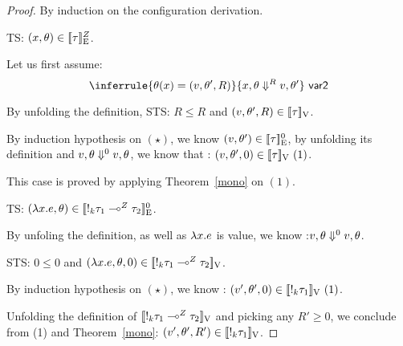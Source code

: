 \begin{proof}
  By induction on the configuration derivation.\\
   

  TS: $(x, \env) \in  \lre{}{\nnatA}{ \type}$.
  
  Let us first assume: \[   \inferrule{  \env(x)  =  (\valr, \env',  \adapt)  }{x,
      \env  \bigstep{\adapt} \valr, \env' }~\textsf{var2}  \]
  
  By unfolding the definition, STS: $R \leq R $  and $ (\valr, \env', R  ) \in \lrv{\type} $.

  By induction hypothesis on $(\star)$, we know $ (\valr, \env') \in \lre{}{0}{\type} $, by unfolding its definition and $ \valr, \env \bigstep{0} \valr, \env $,  we know that : $ (\valr, \env' ,0) \in \lrv{\type}~(1)$.

  This case is proved by applying Theorem~\ref{mono} on $(1)$.\\


   TS: $(\lambda x. \expr , \env) \in  \lre{}{0}{  \bang{\idx} \type_1\lto{\nnatA} \type_2 }$.
  
  By unfoling the definition, as well as $\lambda x. \expr$ is value, we know :$ \valr, \env \bigstep{0} \valr, \env$.
  
  STS: $0 \leq 0 $  and $ (\lambda x.\expr, \env, 0  ) \in \lrv{ \bang{\idx} \type_1\lto{\nnatA} \type_2 } $.

  By induction hypothesis on $(\star)$,  we know : $ (\valr', \env' ,0) \in \lrv{\bang{k} \type_1} ~(1) $.

  Unfolding the definition of $\lrv{ \bang{\idx} \type_1\lto{\nnatA} \type_2 }$ and picking any $R' \geq 0$, we conclude from (1) and Theorem~\ref{mono}: $  (\valr', \env' ,R') \in \lrv{\bang{k} \type_1} $.


\end{proof}

